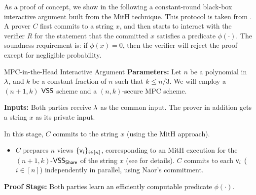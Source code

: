  As a proof of concept, we show in the following a constant-round black-box interactive argument built from the MitH technique. This protocol is taken from \cite{STOC:IKOS07,C:CCLY22}. A prover $C$ first commits to a string $x$, and then starts to interact with the verifier $R$ for the statement that the committed $x$ satisfies a predicate $\phi(\cdot)$. The soundness requirement is: if $\phi(x) = 0$, then the verifier will reject the proof except for negligible probability. 

\begin{ProtocolBox}[label={protocol:BB-ZK}]{MPC-in-the-Head Interactive Argument}
{\bf Parameters:} Let $n$ be a polynomial in $\lambda$, and $k$ be a constant fraction of $n$ such that $k \le n/3$. We will employ a $(n+1, k)$ $\mathsf{VSS}$ scheme and a $(n,k)$-secure MPC scheme. 

{\bf Inputs:} Both parties receive $\lambda$ as the common input. The prover in addition gets a string $x$ as its private input.  

 In this stage, $C$ commits to the string $x$ (using the MitH approach).
\begin{itemize}
\item $C$ prepares $n$ views $\{\mathsf{v}_i\}_{i \in [n]}$, corresponding to an MitH execution for the $(n+1, k)$-$\mathsf{VSS}_\mathsf{Share}$ of the string $x$ (see  for details). $C$ commits to each $\mathsf{v}_i$ ($i \in [n]$) independently in parallel, using Naor's commitment.
\end{itemize}




{\bf Proof Stage:} Both parties learn an efficiently computable predicate $\phi(\cdot)$. 
\begin{enumerate}
   

\end{enumerate}
\end{ProtocolBox}
